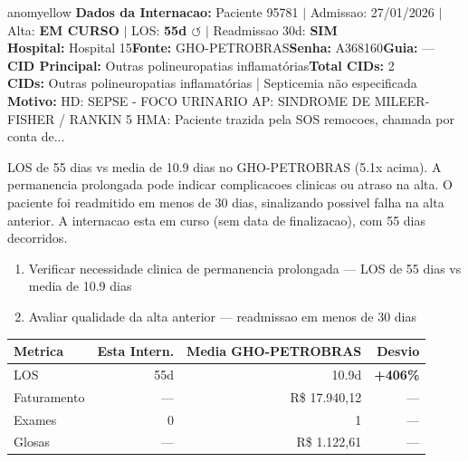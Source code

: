 \documentclass[a4paper,10pt]{article}
\begin{document}
\begin{anomalycard}[Internacao 163334 | GHO-PETROBRAS | MODERADO (z=2.03)]{anomyellow}
\textbf{Dados da Internacao:} Paciente 95781 $\mid$ Admissao: 27/01/2026 $\mid$ Alta: \textcolor{anomorange}{\textbf{EM CURSO}} $\mid$ LOS: \textbf{55d \textcolor{anomorange}{$\circlearrowleft$}} $\mid$ Readmissao 30d: \textcolor{anomred}{\textbf{SIM}}\\
\textbf{Hospital:} Hospital 15\quad\textbf{Fonte:} GHO-PETROBRAS\quad\textbf{Senha:} A368160\quad\textbf{Guia:} ---\\
\textbf{CID Principal:} {\small Outras polineuropatias inflamatórias}\quad\textbf{Total CIDs:} 2\\

\textbf{CIDs:} {\scriptsize Outras polineuropatias inflamatórias | Septicemia não especificada}\\

\textbf{Motivo:} {\scriptsize HD: SEPSE - FOCO URINARIO AP: SINDROME DE MILEER-FISHER / RANKIN 5 HMA: Paciente trazida pela SOS remocoes, chamada por conta de...}\\

\vspace{2pt}\begin{tcolorbox}[colback=severityred!20,colframe=anomyellow,title={\textbf{Interpretacao de Negocio}},fonttitle=\bfseries\small,left=4pt,right=4pt,top=3pt,bottom=3pt]
{\small LOS de 55 dias vs media de 10.9 dias no GHO-PETROBRAS (5.1x acima). A permanencia prolongada pode indicar complicacoes clinicas ou atraso na alta. O paciente foi readmitido em menos de 30 dias, sinalizando possivel falha na alta anterior. A internacao esta em curso (sem data de finalizacao), com 55 dias decorridos.}
\end{tcolorbox}
\begin{tcolorbox}[colback=severityyellow!30,colframe=anomorange,title={\textbf{Recomendacoes Especificas}},fonttitle=\bfseries\small,left=4pt,right=4pt,top=3pt,bottom=3pt]
\begin{enumerate}[nosep,leftmargin=16pt]
\item {\small Verificar necessidade clinica de permanencia prolongada --- LOS de 55 dias vs media de 10.9 dias}
\item {\small Avaliar qualidade da alta anterior --- readmissao em menos de 30 dias}
\end{enumerate}
\end{tcolorbox}
\begin{center}\begin{tabular}{l r r r}\toprule\textbf{Metrica} & \textbf{Esta Intern.} & \textbf{Media GHO-PETROBRAS} & \textbf{Desvio} \\\midrule
LOS & 55d & 10.9d & \textcolor{anomred}{\textbf{+406\%}} \\
Faturamento & --- & R\$ 17.940,12 & --- \\
Exames & 0 & 1 & --- \\
Glosas & --- & R\$ 1.122,61 & --- \\
\bottomrule\end{tabular}\end{center}


\end{anomalycard}
\end{document}
